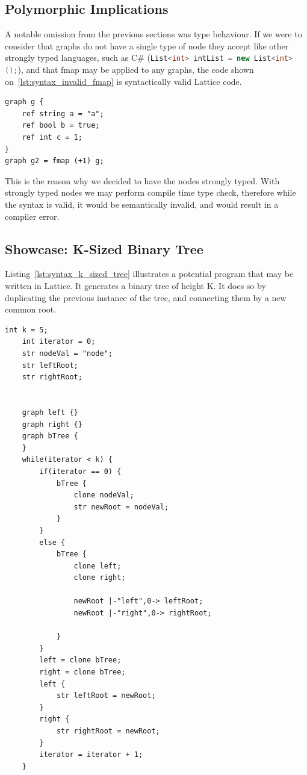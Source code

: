 \subsection{Polymorphic Implications}\label{subsec:syntax_polymorphic_implications}
A notable omission from the previous sections was type behaviour.
If we were to consider that graphs do not have a single
type of node they accept like other strongly typed languages, such as C\# (\lstinline[language=C#]{List<int> intList = new List<int>();}),
and that fmap may be applied to any graphs, the code shown on~\ref{lst:syntax_invalid_fmap} is syntactically valid Lattice code.

\begin{lstlisting}[caption={Fmap applied on a graph that contains non-numeric values.},captionpos=b,label={lst:syntax_invalid_fmap}]
graph g {
    ref string a = "a";
    ref bool b = true;
    ref int c = 1;
}
graph g2 = fmap (+1) g;
\end{lstlisting}


This is the reason why we decided to have the nodes strongly typed.
With strongly typed nodes we may perform compile time type check, therefore while the syntax is valid,
it would be semantically invalid, and would result in a compiler error.


\subsection{Showcase: K-Sized Binary Tree}\label{subsec:syntax_showcase_k_sized_binary_tree}
Listing~\ref{lst:syntax_k_sized_tree} illustrates a potential program that may be written in Lattice.
It generates a binary tree of height K.
It does so by duplicating the previous instance of the tree, and connecting them by a new common root.

\begin{lstlisting}[caption={Lattice code generating a balanced binary tree of height K.},captionpos=b,label={lst:syntax_k_sized_tree}]
    int k = 5;
    int iterator = 0;
    str nodeVal = "node";
    str leftRoot;
    str rightRoot;


    graph left {}
    graph right {}
    graph bTree {
    }
    while(iterator < k) {
        if(iterator == 0) {
            bTree {
                clone nodeVal;
                str newRoot = nodeVal;
            }
        }
        else {
            bTree {
                clone left;
                clone right;

                newRoot |-"left",0-> leftRoot;
                newRoot |-"right",0-> rightRoot;

            }
        }
        left = clone bTree;
        right = clone bTree;
        left {
            str leftRoot = newRoot;
        }
        right {
            str rightRoot = newRoot;
        }
        iterator = iterator + 1;
    }
\end{lstlisting}